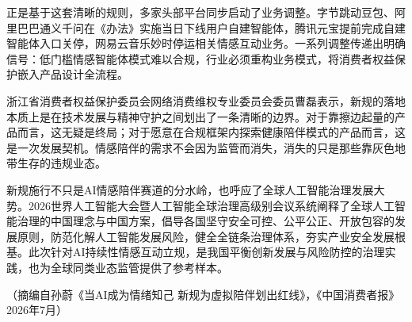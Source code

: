 \documentclass[11pt,a4paper]{ctexart}
\begin{document}
\begin{materialtext}
正是基于这套清晰的规则，多家头部平台同步启动了业务调整。字节跳动豆包、阿里巴巴通义千问在《办法》实施当日下线用户自建智能体，腾讯元宝提前完成自建智能体入口关停，网易云音乐妙时停运相关情感互动业务。一系列调整传递出明确信号：低门槛情感智能体模式难以合规，行业必须重构业务模式，将消费者权益保护嵌入产品设计全流程。

浙江省消费者权益保护委员会网络消费维权专业委员会委员曹磊表示，新规的落地本质上是在技术发展与精神守护之间划出了一条清晰的边界。对于靠擦边起量的产品而言，这无疑是终局；对于愿意在合规框架内探索健康陪伴模式的产品而言，这是一次发展契机。情感陪伴的需求不会因为监管而消失，消失的只是那些靠灰色地带生存的违规业态。

新规施行不只是AI情感陪伴赛道的分水岭，也呼应了全球人工智能治理发展大势。2026世界人工智能大会暨人工智能全球治理高级别会议系统阐释了全球人工智能治理的中国理念与中国方案，倡导各国坚守安全可控、公平公正、开放包容的发展原则，防范化解人工智能发展风险，健全全链条治理体系，夯实产业安全发展根基。此次针对AI持续性情感互动立规，是我国平衡创新发展与风险防控的治理实践，也为全球同类业态监管提供了参考样本。
\end{materialtext}
\begin{flushright}（摘编自孙蔚《当AI成为情绪知己 新规为虚拟陪伴划出红线》，《中国消费者报》2026年7月）\end{flushright}
\end{document}
